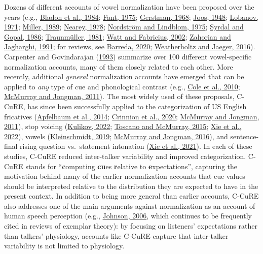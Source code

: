 \documentclass[utf8]{frontiersSCNS}
\begin{document}
Dozens of different accounts of vowel normalization have been proposed over the years (e.g., \protect\hyperlink{ref-Bladon1984}{Bladon et al., 1984}; \protect\hyperlink{ref-fant1975}{Fant, 1975}; \protect\hyperlink{ref-gerstman1968}{Gerstman, 1968}; \protect\hyperlink{ref-joos1948}{Joos, 1948}; \protect\hyperlink{ref-lobanov1971}{Lobanov, 1971}; \protect\hyperlink{ref-miller1989c}{Miller, 1989}; \protect\hyperlink{ref-nearey1978}{Nearey, 1978}; \protect\hyperlink{ref-nordstrom1975}{Nordström and Lindblom, 1975}; \protect\hyperlink{ref-Syrdal1986}{Syrdal and Gopal, 1986}; \protect\hyperlink{ref-traunmuller1981}{Traunmüller, 1981}; \protect\hyperlink{ref-watt2002}{Watt and Fabricius, 2002}; \protect\hyperlink{ref-zahorian1991}{Zahorian and Jagharghi, 1991}; for reviews, see \protect\hyperlink{ref-barreda2020a}{Barreda, 2020}; \protect\hyperlink{ref-weatherholtz-jaeger2016}{Weatherholtz and Jaeger, 2016}). Carpenter and Govindarajan (\protect\hyperlink{ref-carpenter1993}{1993}) summarize over 100 different vowel-specific normalization accounts, many of them closely related to each other. More recently, additional \emph{general} normalization accounts have emerged that can be applied to \emph{any} type of cue and phonological contrast (e.g., \protect\hyperlink{ref-cole2010}{Cole et al., 2010}; \protect\hyperlink{ref-mcmurray-jongman2011}{McMurray and Jongman, 2011}). The most widely used of these proposals, C-CuRE, has since been successfully applied to the categorization of US English fricatives (\protect\hyperlink{ref-apfelbaum2014}{Apfelbaum et al., 2014}; \protect\hyperlink{ref-crinnion2020}{Crinnion et al., 2020}; \protect\hyperlink{ref-mcmurray-jongman2011}{McMurray and Jongman, 2011}), stop voicing (\protect\hyperlink{ref-kulikov2022}{Kulikov, 2022}; \protect\hyperlink{ref-toscano2015}{Toscano and McMurray, 2015}; \protect\hyperlink{ref-xie2022}{Xie et al., 2022}), vowels (\protect\hyperlink{ref-kleinschmidt2019}{Kleinschmidt, 2019}; \protect\hyperlink{ref-mcmurray-jongman2016}{McMurray and Jongman, 2016}), and sentence-final rising question vs.~statement intonation (\protect\hyperlink{ref-xie2021cognition}{Xie et al., 2021}). In each of these studies, C-CuRE reduced inter-talker variability and improved categorization. C-CuRE stands for ``\textbf{c}omputing \textbf{cu}es \textbf{r}elative to \textbf{e}xpectations'', capturing the motivation behind many of the earlier normalization accounts that cue values should be interpreted relative to the distribution they are expected to have in the present context. In addition to being more general than earlier accounts, C-CuRE also addresses one of the main arguments against normalization as an account of human speech perception (e.g., \protect\hyperlink{ref-johnson2006}{Johnson, 2006}, which continues to be frequently cited in reviews of exemplar theory): by focusing on listeners' expectations rather than talkers' physiology, accounts like C-CuRE capture that inter-talker variability is not limited to physiology.
\end{document}
